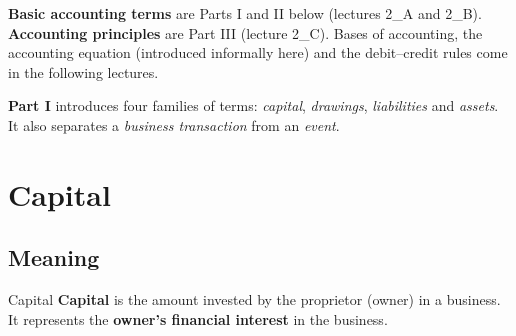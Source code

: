 \documentclass[11pt,a4paper]{article}
\begin{document}
\begin{center}
\end{center}

\begin{notebox}
\textbf{Basic accounting terms} are Parts I and II below (lectures 2\_A and 2\_B).
\textbf{Accounting principles} are Part III (lecture 2\_C). Bases of accounting, the accounting
equation (introduced informally here) and the debit--credit rules come in the following lectures.
\end{notebox}

\textbf{Part I} introduces four families of terms: \emph{capital}, \emph{drawings}, \emph{liabilities}
and \emph{assets}. It also separates a \emph{business transaction} from an \emph{event}.

\section{Capital}

\subsection{Meaning}

\begin{defbox}{Capital}
\textbf{Capital} is the amount invested by the proprietor (owner) in a business. It represents the
\textbf{owner's financial interest} in the business.
\end{defbox}
\end{document}
